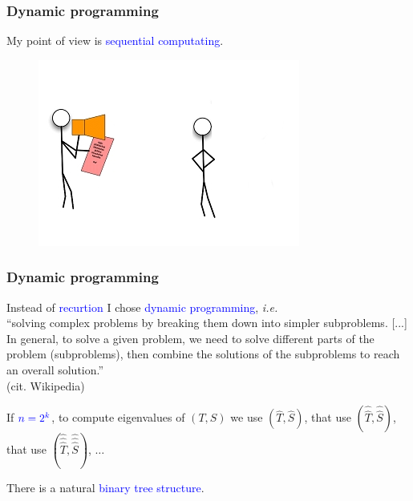 \documentclass{beamer}
\theoremstyle{definition} \newtheorem{de}{Def}
\theoremstyle{remark} \newtheorem{os}[de]{Remark}
\theoremstyle{plain} \newtheorem{te}[de]{Teo}
\theoremstyle{plain} \newtheorem{co}[de]{Cor}
\theoremstyle{plain} \newtheorem{pr}[de]{Prop}
\theoremstyle{plain} \newtheorem{lem}[de]{Lemm}
\theoremstyle{remark} \newtheorem{rem}[de]{Remark}
\begin{document}
\begin{frame}
  \frametitle{Dynamic programming}
  My point of view is \textcolor{blue}{sequential computating}.

  \begin{figure}
    \centering
    \includegraphics[scale=0.3]{images/SequentialComputing.jpg}
  \end{figure}

\end{frame}

\begin{frame}
  \frametitle{Dynamic programming}

  Instead of \textcolor{blue}{recurtion} I chose \textcolor{blue}{dynamic programming}, \emph{i.e.} \\ ``solving complex problems by breaking them down into simpler subproblems. [...] In general, to solve a given problem, we need to solve different parts of the problem (subproblems), then combine the solutions of the subproblems to reach an overall solution.'' \\ (cit. Wikipedia)

  \pause

  If $\textcolor{blue}{n=2^k}$, to compute eigenvalues of $(T,S)$ we use $(\hat T, \hat S)$, that use $(\hat{\hat T}, \hat{\hat S})$, that use $(\hat{\hat{\hat T}}, \hat{\hat{\hat S}})$, $\dots$

  \pause

  There is a natural \textcolor{blue}{binary tree structure}.

\end{frame}
\end{document}
